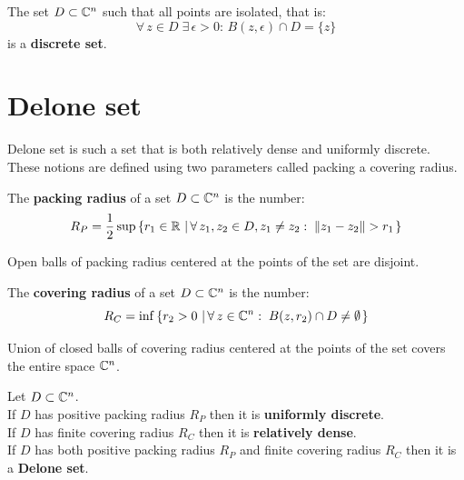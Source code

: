 \documentclass[text.tex]{subfiles}
\begin{document}
\begin{definition}
The set $D\subset \mathbb{C}^n$ such that all points are isolated, that is: 
$$\forall\, z\in D\;\exists\, \epsilon>0:\, B(z,\epsilon)\cap D = \{z\}$$
is a \textbf{discrete set}.
\end{definition}

\section{Delone set} %
Delone set is such a set that is both relatively dense and uniformly discrete. These notions are defined using two parameters called packing a covering radius.

\begin{definition}\label{def_deloneSetPacking}
The \textbf{packing radius} of a set $D\subset \mathbb{C}^n$ is the number: 
$$R_P = \frac{1}{2}\sup\left\{ r_1\in \mathbb{R}\,\left|\, \forall\, z_1,z_2\in D, z_1\neq z_2:\; \lVert z_1-z_2\rVert >r_1 \right. \right\}$$
\end{definition}

\begin{remark}
Open balls of packing radius centered at the points of the set are disjoint. 
\end{remark}

\begin{definition}\label{def_deloneSetCovering}
The \textbf{covering radius} of a set $D\subset \mathbb{C}^n$ is the number: 
$$R_C = \inf\left\{ r_2>0\,\left|\, \forall\, z\in\mathbb{C}^n:\; B(z,r_2)\cap D \neq \emptyset \right. \right\}$$
\end{definition}

\begin{remark}
Union of closed balls of covering radius centered at the points of the set covers the entire space $\mathbb{C}^n$. 
\end{remark}

\begin{definition}\label{def_deloneSet}
Let $D\subset \mathbb{C}^n$.\\
If $D$ has positive packing radius $R_P$ then it is \textbf{uniformly discrete}.\\
If $D$ has finite covering radius $R_C$ then it is \textbf{relatively dense}.\\
If $D$ has both positive packing radius $R_P$ and finite covering radius $R_C$ then it is a \textbf{Delone set}.
\end{definition}
\end{document}
